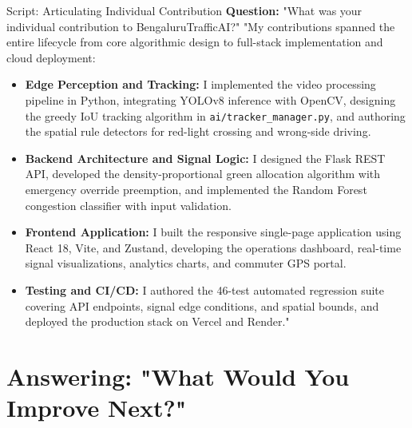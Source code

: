 \documentclass[11pt,a4paper,oneside]{report}
\begin{document}
\begin{interviewq}{Script: Articulating Individual Contribution}
\textbf{Question:} "What was your individual contribution to BengaluruTrafficAI?"
\tcblower
"My contributions spanned the entire lifecycle from core algorithmic design to full-stack implementation and cloud deployment:

\begin{itemize}
    \item \textbf{Edge Perception and Tracking:} I implemented the video processing pipeline in Python, integrating YOLOv8 inference with OpenCV, designing the greedy IoU tracking algorithm in \texttt{ai/tracker\_manager.py}, and authoring the spatial rule detectors for red-light crossing and wrong-side driving.
    \item \textbf{Backend Architecture and Signal Logic:} I designed the Flask REST API, developed the density-proportional green allocation algorithm with emergency override preemption, and implemented the Random Forest congestion classifier with input validation.
    \item \textbf{Frontend Application:} I built the responsive single-page application using React 18, Vite, and Zustand, developing the operations dashboard, real-time signal visualizations, analytics charts, and commuter GPS portal.
    \item \textbf{Testing and CI/CD:} I authored the 46-test automated regression suite covering API endpoints, signal edge conditions, and spatial bounds, and deployed the production stack on Vercel and Render."
\end{itemize}
\end{interviewq}

\section{Answering: "What Would You Improve Next?"}
\label{sec:script_future_improvements}
\end{document}
